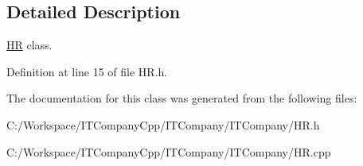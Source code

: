 \subsection{Detailed Description}
\hyperlink{class_h_r}{HR} class. 

Definition at line 15 of file H\+R.\+h.



The documentation for this class was generated from the following files\+:\begin{DoxyCompactItemize}
\item 
C\+:/\+Workspace/\+I\+T\+Company\+Cpp/\+I\+T\+Company/\+I\+T\+Company/H\+R.\+h\item 
C\+:/\+Workspace/\+I\+T\+Company\+Cpp/\+I\+T\+Company/\+I\+T\+Company/H\+R.\+cpp\end{DoxyCompactItemize}
